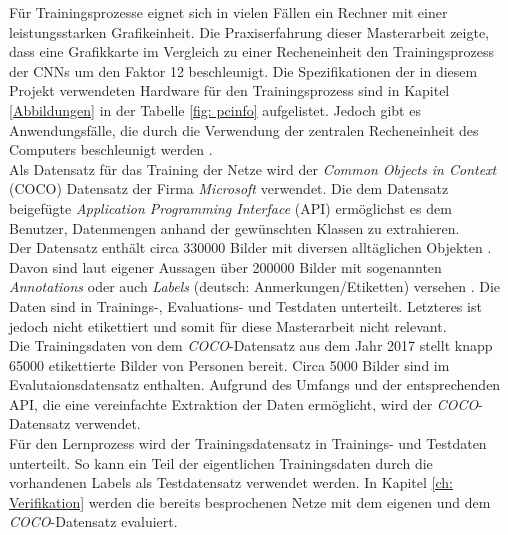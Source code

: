 		Für Trainingsprozesse eignet sich in vielen Fällen ein Rechner mit einer leistungsstarken Grafikeinheit. Die Praxiserfahrung dieser Masterarbeit zeigte, dass eine Grafikkarte im Vergleich zu einer Recheneinheit den Trainingsprozess der CNNs um den Faktor 12 beschleunigt. Die Spezifikationen der in diesem Projekt verwendeten Hardware für den Trainingsprozess sind in Kapitel \ref{Abbildungen} in der Tabelle \ref{fig: pcinfo} aufgelistet. Jedoch gibt es Anwendungsfälle, die durch die Verwendung der zentralen Recheneinheit des Computers beschleunigt werden \cite{cpugpu}. \\
		
		Als Datensatz für das Training der Netze wird der \textit{Common Objects in Context} (COCO) Datensatz der Firma \textit{Microsoft} verwendet. Die dem Datensatz beigefügte \textit{Application Programming Interface} (API) ermöglichst es dem Benutzer, Datenmengen anhand der gewünschten Klassen zu extrahieren.\\
		
		Der Datensatz enthält circa 330000 Bilder mit diversen alltäglichen Objekten \cite{coco, cocopaper}. Davon sind laut eigener Aussagen über 200000 Bilder mit sogenannten \textit{Annotations} oder auch \textit{Labels} (deutsch: Anmerkungen/Etiketten) versehen \cite{coco}. Die Daten sind in Trainings-, Evaluations- und Testdaten unterteilt. Letzteres ist jedoch nicht etikettiert und somit für diese Masterarbeit nicht relevant.\\
		
		Die Trainingsdaten von dem \textit{COCO}-Datensatz aus dem Jahr 2017 stellt knapp 65000 etikettierte Bilder von Personen bereit. Circa 5000 Bilder sind im Evalutaionsdatensatz enthalten. Aufgrund des Umfangs und der entsprechenden API, die eine vereinfachte Extraktion der Daten ermöglicht, wird der \textit{COCO}-Datensatz verwendet. \\
		
		Für den Lernprozess wird der Trainingsdatensatz in Trainings- und Testdaten unterteilt. So kann ein Teil der eigentlichen Trainingsdaten durch die vorhandenen Labels als Testdatensatz verwendet werden. In Kapitel \ref{ch: Verifikation} werden die bereits besprochenen Netze mit dem eigenen und dem \textit{COCO}-Datensatz evaluiert.
		
